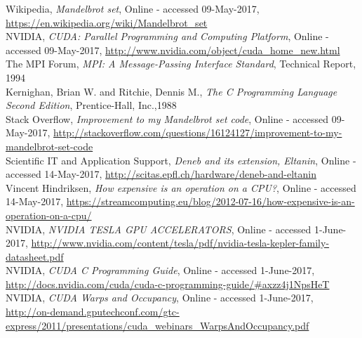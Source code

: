 \documentclass[11pt,a4paper]{article}
\begin{document}
\vspace{-0.2cm}
\begin{thebibliography}{1}

 Wikipedia, {\em Mandelbrot set}, Online - accessed 09-May-2017, \url{https://en.wikipedia.org/wiki/Mandelbrot_set}\\[-17pt]

 NVIDIA, {\em CUDA: Parallel Programming and Computing Platform}, Online - accessed 09-May-2017, \url{http://www.nvidia.com/object/cuda_home_new.html}\\[-17pt]

 The MPI Forum, {\em MPI: A Message-Passing Interface Standard}, Technical Report, 1994\\[-17pt]

 Kernighan, Brian W. and Ritchie, Dennis M., {\em The C Programming Language Second Edition}, Prentice-Hall, Inc.,1988\\[-17pt]

 Stack Overflow, {\em Improvement to my Mandelbrot set code}, Online - accessed 09-May-2017, \url{http://stackoverflow.com/questions/16124127/improvement-to-my-mandelbrot-set-code}\\[-17pt]

 Scientific IT and Application Support, {\em Deneb and its extension, Eltanin}, Online - accessed 14-May-2017, \url{http://scitas.epfl.ch/hardware/deneb-and-eltanin}\\[-17pt]

 Vincent Hindriksen, {\em How expensive is an operation on a CPU?}, Online - accessed 14-May-2017, \url{https://streamcomputing.eu/blog/2012-07-16/how-expensive-is-an-operation-on-a-cpu/}\\[-17pt]


 NVIDIA, {\em NVIDIA TESLA GPU ACCELERATORS}, Online - accessed 1-June-2017,
\url{http://www.nvidia.com/content/tesla/pdf/nvidia-tesla-kepler-family-datasheet.pdf}\\[-17pt]

 NVIDIA, {\em CUDA C Programming Guide}, Online - accessed 1-June-2017,
\url{http://docs.nvidia.com/cuda/cuda-c-programming-guide/#axzz4j1NpsHeT}\\[-17pt]

 NVIDIA, {\em CUDA Warps and Occupancy}, Online - accessed 1-June-2017,
\url{http://on-demand.gputechconf.com/gtc-express/2011/presentations/cuda_webinars_WarpsAndOccupancy.pdf}

\end{thebibliography}
\end{document}
